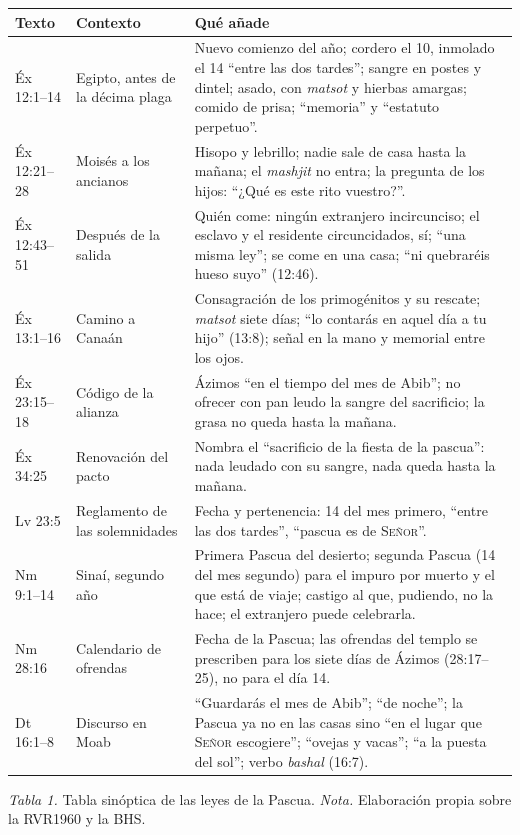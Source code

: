 \documentclass[11pt,letterpaper]{article}
\newcommand{\SENOR}{\textsc{Señor}}
\begin{document}
\begin{table}[!htbp]\centering\small\renewcommand{\arraystretch}{1.2}
\begin{tabular}{@{}L{2.3cm}L{3.3cm}L{8.8cm}@{}}
\toprule
\textbf{Texto} & \textbf{Contexto} & \textbf{Qué añade} \\ \midrule
Éx 12:1--14 & Egipto, antes de la décima plaga & Nuevo comienzo del año; cordero el 10, inmolado el 14 ``entre las dos tardes''; sangre en postes y dintel; asado, con \emph{matsot} y hierbas amargas; comido de prisa; ``memoria'' y ``estatuto perpetuo''. \\
Éx 12:21--28 & Moisés a los ancianos & Hisopo y lebrillo; nadie sale de casa hasta la mañana; el \emph{mashjit} no entra; la pregunta de los hijos: ``¿Qué es este rito vuestro?''. \\
Éx 12:43--51 & Después de la salida & Quién come: ningún extranjero incircunciso; el esclavo y el residente circuncidados, sí; ``una misma ley''; se come en una casa; ``ni quebraréis hueso suyo'' (12:46). \\
Éx 13:1--16 & Camino a Canaán & Consagración de los primogénitos y su rescate; \emph{matsot} siete días; ``lo contarás en aquel día a tu hijo'' (13:8); señal en la mano y memorial entre los ojos. \\
Éx 23:15--18 & Código de la alianza & Ázimos ``en el tiempo del mes de Abib''; no ofrecer con pan leudo la sangre del sacrificio; la grasa no queda hasta la mañana. \\
Éx 34:25 & Renovación del pacto & Nombra el ``sacrificio de la fiesta de la pascua'': nada leudado con su sangre, nada queda hasta la mañana. \\
Lv 23:5 & Reglamento de las solemnidades & Fecha y pertenencia: 14 del mes primero, ``entre las dos tardes'', ``pascua es de \SENOR''. \\
Nm 9:1--14 & Sinaí, segundo año & Primera Pascua del desierto; segunda Pascua (14 del mes segundo) para el impuro por muerto y el que está de viaje; castigo al que, pudiendo, no la hace; el extranjero puede celebrarla. \\
Nm 28:16 & Calendario de ofrendas & Fecha de la Pascua; las ofrendas del templo se prescriben para los siete días de Ázimos (28:17--25), no para el día 14. \\
Dt 16:1--8 & Discurso en Moab & ``Guardarás el mes de Abib''; ``de noche''; la Pascua ya no en las casas sino ``en el lugar que \SENOR{} escogiere''; ``ovejas y vacas''; ``a la puesta del sol''; verbo \emph{bashal} (16:7). \\
\bottomrule
\end{tabular}\par
{\footnotesize\color{sepia}\textit{Tabla 1.} Tabla sinóptica de las leyes de la Pascua. \textit{Nota.} Elaboración propia sobre la RVR1960 y la BHS.}
\end{table}
\end{document}
